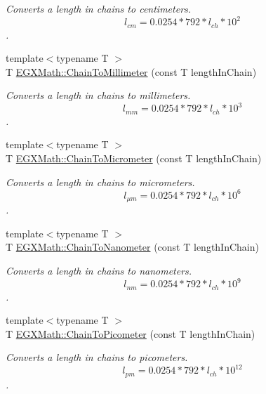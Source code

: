 \begin{DoxyCompactItemize}
\begin{DoxyCompactList}\small\item\em Converts a length in chains to centimeters. \[ l_{cm}=0.0254 * 792 * l_{ch} * 10^{2} \]. \end{DoxyCompactList}\item 
{\footnotesize template$<$typename T $>$ }\\T \mbox{\hyperlink{group___e_g_x_math-_conversions-_length_conversions-_surveyors-_chain-_s_i_gab2a17c49dbe6d8ec546e8819de2df33b}{E\+G\+X\+Math\+::\+Chain\+To\+Millimeter}} (const T length\+In\+Chain)
\begin{DoxyCompactList}\small\item\em Converts a length in chains to millimeters. \[ l_{mm}=0.0254 * 792 * l_{ch} * 10^{3} \]. \end{DoxyCompactList}\item 
{\footnotesize template$<$typename T $>$ }\\T \mbox{\hyperlink{group___e_g_x_math-_conversions-_length_conversions-_surveyors-_chain-_s_i_gab6d1ab0738e0a31f328352569fa00767}{E\+G\+X\+Math\+::\+Chain\+To\+Micrometer}} (const T length\+In\+Chain)
\begin{DoxyCompactList}\small\item\em Converts a length in chains to micrometers. \[ l_{\mu m}=0.0254 * 792 * l_{ch} * 10^{6} \]. \end{DoxyCompactList}\item 
{\footnotesize template$<$typename T $>$ }\\T \mbox{\hyperlink{group___e_g_x_math-_conversions-_length_conversions-_surveyors-_chain-_s_i_ga6120f342646451a0aa544d3fc3699f81}{E\+G\+X\+Math\+::\+Chain\+To\+Nanometer}} (const T length\+In\+Chain)
\begin{DoxyCompactList}\small\item\em Converts a length in chains to nanometers. \[ l_{nm}=0.0254 * 792 * l_{ch} * 10^{9} \]. \end{DoxyCompactList}\item 
{\footnotesize template$<$typename T $>$ }\\T \mbox{\hyperlink{group___e_g_x_math-_conversions-_length_conversions-_surveyors-_chain-_s_i_ga27f06f3f63727a16e02afaf8f01f4b45}{E\+G\+X\+Math\+::\+Chain\+To\+Picometer}} (const T length\+In\+Chain)
\begin{DoxyCompactList}\small\item\em Converts a length in chains to picometers. \[ l_{pm}=0.0254 * 792 * l_{ch} * 10^{12} \]. \end{DoxyCompactList}\item 

\end{DoxyCompactItemize}
